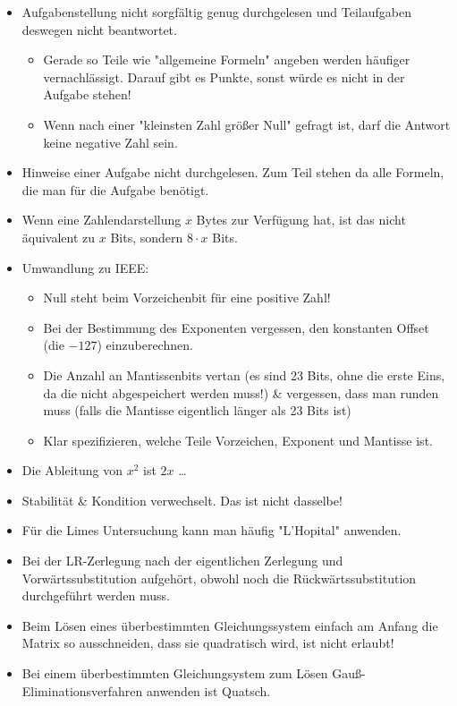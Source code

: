 \documentclass{scrartcl}
\begin{document}
	\begin{itemize}
		\item Aufgabenstellung nicht sorgfältig genug durchgelesen und Teilaufgaben deswegen nicht beantwortet. 
		\begin{itemize}
			\item Gerade so Teile wie "allgemeine Formeln" angeben werden häufiger vernachlässigt. Darauf gibt es Punkte, sonst würde es nicht in der Aufgabe stehen!
			\item Wenn nach einer "kleinsten Zahl größer Null" gefragt ist, darf die Antwort keine negative Zahl sein.
		\end{itemize}
		\item Hinweise einer Aufgabe nicht durchgelesen. Zum Teil stehen da alle Formeln, die man für die Aufgabe benötigt.
		\item Wenn eine Zahlendarstellung $x$ Bytes zur Verfügung hat, ist das nicht äquivalent zu $x$ Bits, sondern $8 \cdot x$ Bits.
		\item Umwandlung zu IEEE: 
		\begin{itemize}
			\item Null steht beim Vorzeichenbit für eine positive Zahl!
			\item Bei der Bestimmung des Exponenten vergessen, den konstanten Offset (die $-127$) einzuberechnen.
			\item Die Anzahl an Mantissenbits vertan (es sind 23 Bits, ohne die erste Eins, da die nicht abgespeichert werden muss!) \& vergessen, dass man runden muss (falls die Mantisse eigentlich länger als 23 Bits ist)
			\item Klar spezifizieren, welche Teile Vorzeichen, Exponent und Mantisse ist.
		\end{itemize}
		\item Die Ableitung von $x^2$ ist $2x$ \dots
		\item Stabilität \& Kondition verwechselt. Das ist nicht dasselbe!
		\item Für die Limes Untersuchung kann man häufig "L'Hopital" anwenden.
		\item Bei der LR-Zerlegung nach der eigentlichen Zerlegung und Vorwärtssubstitution aufgehört, obwohl noch die Rückwärtssubstitution durchgeführt werden muss.
		\item Beim Lösen eines überbestimmten Gleichungssystem einfach am Anfang die Matrix so ausschneiden, dass sie quadratisch wird, ist nicht erlaubt!
		\item Bei einem überbestimmten Gleichungsystem zum Lösen Gauß-Eliminationsverfahren anwenden ist Quatsch.

\end{itemize}
\end{document}
